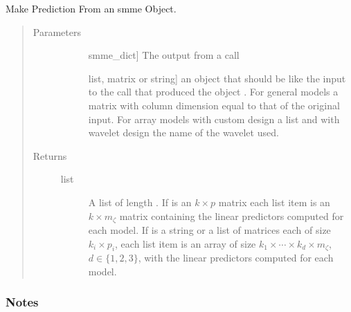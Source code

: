 \documentclass[letterpaper,10pt,english]{sphinxmanual}
\begin{document}
\begin{fulllineitems}
\label{\detokenize{pysmme:pysmme.tools.predict}}
\sphinxAtStartPar
Make Prediction From an smme Object.
\begin{quote}\begin{description}
\item[{Parameters}] \leavevmode\begin{description}
\item[{}] \leavevmode{[}smme\_dict{]}
\sphinxAtStartPar
The output from a  call

\item[{}] \leavevmode{[}list, matrix or string{]}
\sphinxAtStartPar
an object that should be like the input to the  call that 
produced the object . For general  models a matrix
with column dimension equal to that of  the original input. 
For array models with custom design a list 
and with wavelet design the name of the wavelet used.

\end{description}

\item[{Returns}] \leavevmode\begin{description}
\item[{list}] \leavevmode
\sphinxAtStartPar
A list of length . If  is an \(k \times p\) matrix 
each list item is an \(k \times m_\zeta\) matrix containing the linear
predictors computed for each model. If  is a string or  a
list of matrices each of size \(k_{i} \times p_i\),  each list item is an array
of size \(k_1 \times \cdots \times k_d \times m_\zeta\),
\(d\in \{1,2,3\}\), with the linear predictors computed for each model.

\end{description}

\end{description}\end{quote}
\subsubsection*{Notes}


\end{fulllineitems}
\end{document}
